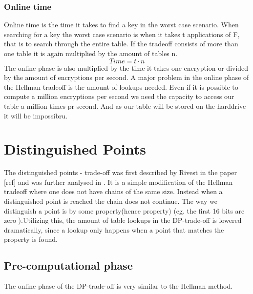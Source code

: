 \subsubsection{Online time}
Online time is the time it takes to find a key in the worst case scenario. When searching for a key the worst case scenario is when it takes t applications of F, that is to search through the entire table. If the tradeoff consists of more than one table it is again multiplied by the amount of tables n.
\begin{equation}
  Time=t\cdot n
\end{equation}
The online phase is also multiplied by the time it takes one encryption or divided by the amount of encryptions per second. A major problem in the online phase of the  Hellman tradeoff is the amount of lookups needed. Even if it is possible to compute a million encryptions per second we need the capacity to access our table a million times pr second. And as our table will be stored on the harddrive it will be impossibru.



\section{Distinguished Points}
\label{sec:dptheory}

The distinguished points - trade-off was first described by Rivest in
the paper [ref] and was further analysed in \cite{DP}. It is a simple modification of the Hellman tradeoff
where one does not have chains of the same size. Instead when a
distinguished point is reached the chain does not continue. The way we distinguish a point is by some property(hence property) (eg. the first 16 bits are zero ).Utilizing this, the amount of table lookups in the DP-trade-off is lowered dramatically, since a lookup only happens when a point that matches the property is found.
\subsection{Pre-computational phase}
The online phase of the DP-trade-off is very similar to the Hellman method.

